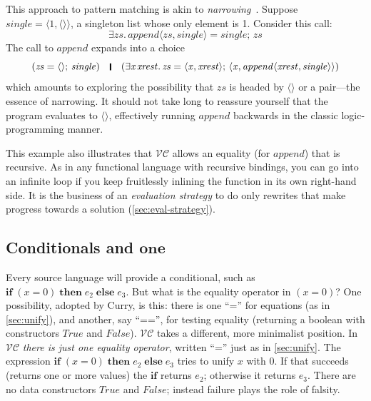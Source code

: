 \documentclass[acmsmall,review,dvipsnames]{acmart}
\newcommand{\Conid}[1]{\mathit{#1}}
\newcommand{\Varid}[1]{\mathit{#1}}
\newcommand{\versecalc}{$\mathcal{VC}$}
\begin{document}
This approach to pattern matching is akin to \emph{narrowing}~\cite{hanus:survey}.
Suppose \ensuremath{\Varid{single}\mathrel{=}\langle{}\mathrm{1},\langle\rangle\rangle}, a singleton list whose only element is 1.
Consider this call:
$$
\ensuremath{\exists\Varid{zs}.\,\Varid{append}\langle\Varid{zs},\Varid{single}\rangle\mathrel{=}\Varid{single};\,\Varid{zs}}
$$
The call to \ensuremath{\Varid{append}} expands into a choice
$$
  \ensuremath{(\Varid{zs}\mathrel{=}\langle\rangle;\,\Varid{single})} \quad \ensuremath{\rule[-0.3mm]{0.5mm}{2.5mm}} \quad
  \ensuremath{(\exists\Varid{x}\hspace{0.3mm}\Varid{xrest}.\,\Varid{zs}\mathrel{=}\langle{}\Varid{x},\Varid{xrest}\rangle;\,\langle{}\Varid{x},\Varid{append}\langle\Varid{xrest},\Varid{single}\rangle\rangle)}
$$
which amounts to exploring the possibility that \ensuremath{\Varid{zs}} is headed by \ensuremath{\langle\rangle} or a pair---the
essence of narrowing.  It should not take long to reassure yourself that the program
evaluates to \ensuremath{\langle\rangle}, effectively running \ensuremath{\Varid{append}} backwards in the classic logic-programming manner.

This example also illustrates that \versecalc{} allows an equality (for \ensuremath{\Varid{append}})
that is recursive. As in any functional language with recursive bindings, you can
go into an infinite loop if you keep fruitlessly inlining the function in its own right-hand side.
It is the business of an \emph{evaluation strategy} to do only rewrites that make
progress towards a solution (\cref{sec:eval-strategy}).

\subsection{Conditionals and \ensuremath{\textbf{one}}} \label{sec:rigid} \label{sec:one} \label{sec:if}

Every source language will provide a conditional, such as \ensuremath{\textbf{if}\;(\Varid{x}\mathrel{=}\mathrm{0})\;\textbf{then}\;\Varid{e}_{\mathrm{2}}\;\textbf{else}\;\Varid{e}_{\mathrm{3}}}.  But what is the equality operator in \ensuremath{(\Varid{x}\mathrel{=}\mathrm{0})}?  One
possibility, adopted by Curry, is this: there is one ``='' for
equations (as in \cref{sec:unify}), and another, say ``=='', for
testing equality (returning a boolean with constructors \ensuremath{\Conid{True}} and \ensuremath{\Conid{False}}).  \versecalc{} takes a
different, more minimalist position. In \versecalc{} \emph{there is just one equality operator}, written ``='' just as in
\cref{sec:unify}. The expression \ensuremath{\textbf{if}\;(\Varid{x}\mathrel{=}\mathrm{0})\;\textbf{then}\;\Varid{e}_{\mathrm{2}}\;\textbf{else}\;\Varid{e}_{\mathrm{3}}} tries to unify \ensuremath{\Varid{x}} with \ensuremath{\mathrm{0}}.  If that succeeds (returns one or more values)
the \ensuremath{\textbf{if}} returns \ensuremath{\Varid{e}_{\mathrm{2}}}; otherwise it returns \ensuremath{\Varid{e}_{\mathrm{3}}}.  There are no data constructors \ensuremath{\Conid{True}} and \ensuremath{\Conid{False}}; instead
failure plays the role of falsity.
\end{document}
